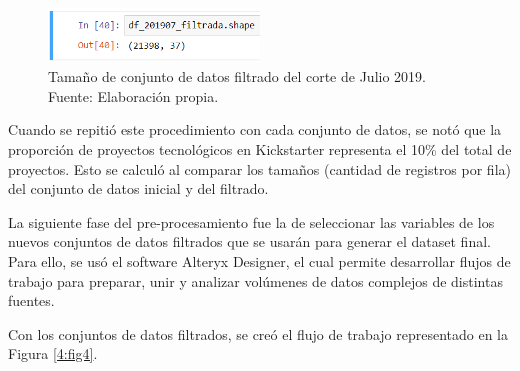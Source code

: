 \begin{figure}[h]
	\begin{center}
		\includegraphics[width=0.5\textwidth]{4/figures/dataset_filtrada_201907.png}
		\caption{Tamaño de conjunto de datos filtrado del corte de Julio 2019. Fuente: Elaboración propia.}
		\label{4:fig3}
	\end{center}
\end{figure}

Cuando se repitió este procedimiento con cada conjunto de datos, se notó que la proporción de proyectos tecnológicos en Kickstarter representa el 10\% del total de proyectos. Esto se calculó al comparar los tamaños (cantidad de registros por fila) del conjunto de datos inicial y del filtrado.

La siguiente fase del pre-procesamiento fue la de seleccionar las variables de los nuevos conjuntos de datos filtrados que se usarán para generar el dataset final. Para ello, se usó el software Alteryx Designer, el cual permite desarrollar flujos de trabajo para preparar, unir y analizar volúmenes de datos complejos de distintas fuentes.

Con los conjuntos de datos filtrados, se creó el flujo de trabajo representado en la Figura \ref{4:fig4}.

